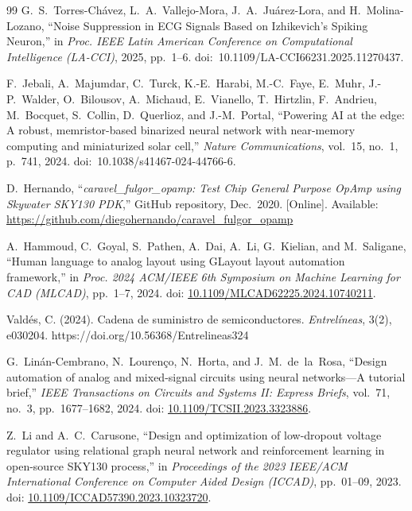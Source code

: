 \documentclass[letter, 12pt]{article}
\begin{document}
\begin{thebibliography}{99}
G.~S.~Torres-Ch\'avez, L.~A.~Vallejo-Mora, J.~A.~Ju\'arez-Lora, and H.~Molina-Lozano,
``Noise Suppression in ECG Signals Based on Izhikevich’s Spiking Neuron,''
in \emph{Proc. IEEE Latin American Conference on Computational Intelligence (LA-CCI)},
2025, pp.~1--6.
doi:~10.1109/LA-CCI66231.2025.11270437.

F.~Jebali, A.~Majumdar, C.~Turck, K.-E.~Harabi, M.-C.~Faye, E.~Muhr,
J.-P.~Walder, O.~Bilousov, A.~Michaud, E.~Vianello, T.~Hirtzlin,
F.~Andrieu, M.~Bocquet, S.~Collin, D.~Querlioz, and J.-M.~Portal,
``Powering AI at the edge: A robust, memristor-based binarized neural network
with near-memory computing and miniaturized solar cell,''
\emph{Nature Communications}, vol.~15, no.~1, p.~741, 2024.
doi:~10.1038/s41467-024-44766-6.

D.~Hernando, ``\textit{caravel\_fulgor\_opamp: Test Chip General Purpose OpAmp using Skywater SKY130 PDK},'' GitHub repository, Dec.~2020. [Online]. Available: \url{https://github.com/diegohernando/caravel_fulgor_opamp}

A.~Hammoud, C.~Goyal, S.~Pathen, A.~Dai, A.~Li, G.~Kielian, and M.~Saligane,
``Human language to analog layout using GLayout layout automation framework,''
in \emph{Proc. 2024 ACM/IEEE 6th Symposium on Machine Learning for CAD (MLCAD)}, 
pp.~1--7, 2024.
doi: \href{https://doi.org/10.1109/MLCAD62225.2024.10740211}{10.1109/MLCAD62225.2024.10740211}.

Valdés, C. (2024). Cadena de suministro de semiconductores. \textit{Entrelíneas}, 3(2), e030204. https://doi.org/10.56368/Entrelineas324

G.~Linán-Cembrano, N.~Lourenço, N.~Horta, and J.~M.~de~la~Rosa,
``Design automation of analog and mixed-signal circuits using neural networks—A tutorial brief,''
\emph{IEEE Transactions on Circuits and Systems II: Express Briefs}, 
vol.~71, no.~3, pp.~1677--1682, 2024.  
doi: \href{https://doi.org/10.1109/TCSII.2023.3323886}{10.1109/TCSII.2023.3323886}.

Z.~Li and A.~C.~Carusone,
``Design and optimization of low-dropout voltage regulator using relational graph neural network and reinforcement learning in open-source SKY130 process,''
in \emph{Proceedings of the 2023 IEEE/ACM International Conference on Computer Aided Design (ICCAD)}, 
pp.~01--09, 2023.  
doi: \href{https://doi.org/10.1109/ICCAD57390.2023.10323720}{10.1109/ICCAD57390.2023.10323720}.



\end{thebibliography}
\end{document}
